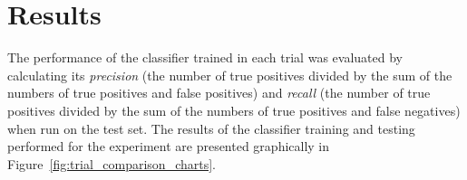 \documentclass{sig-alternate-05-2015}
\newcommand{\newterm}[1]{{\textit{#1}}}
\begin{document}

	\section{Results} {
	\label{sec:results}

		The performance of the classifier trained in each trial was evaluated by calculating its \newterm{precision} (the number of true positives divided by the sum of the numbers of true positives and false positives) and \newterm{recall} (the number of true positives divided by the sum of the numbers of true positives and false negatives) when run on the test set.
		The results of the classifier training and testing performed for the experiment are presented graphically in Figure~\ref{fig:trial_comparison_charts}.



}
\end{document}
